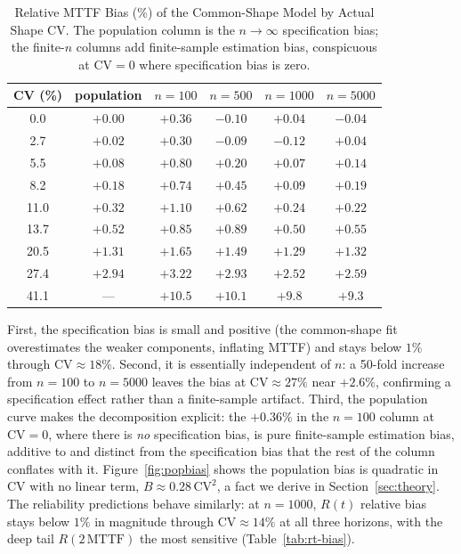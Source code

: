 \documentclass[11pt]{article}
\newcommand{\CV}{\mathrm{CV}}
\newcommand{\MTTF}{\mathrm{MTTF}}
\begin{document}
\begin{table}[htbp]
\centering
\caption{Relative MTTF Bias (\%) of the Common-Shape Model by Actual Shape CV. The population column is the $n\to\infty$ specification bias; the finite-$n$ columns add finite-sample estimation bias, conspicuous at $\CV=0$ where specification bias is zero.}
\label{tab:consequence}
\small
\begin{tabular}{cccccc}
\hline
CV (\%) & population & $n=100$ & $n=500$ & $n=1000$ & $n=5000$ \\
\hline
0.0 & $+0.00$ & $+0.36$ & $-0.10$ & $+0.04$ & $-0.04$ \\
2.7 & $+0.02$ & $+0.30$ & $-0.09$ & $-0.12$ & $+0.04$ \\
5.5 & $+0.08$ & $+0.80$ & $+0.20$ & $+0.07$ & $+0.14$ \\
8.2 & $+0.18$ & $+0.74$ & $+0.45$ & $+0.09$ & $+0.19$ \\
11.0 & $+0.32$ & $+1.10$ & $+0.62$ & $+0.24$ & $+0.22$ \\
13.7 & $+0.52$ & $+0.85$ & $+0.89$ & $+0.50$ & $+0.55$ \\
20.5 & $+1.31$ & $+1.65$ & $+1.49$ & $+1.29$ & $+1.32$ \\
27.4 & $+2.94$ & $+3.22$ & $+2.93$ & $+2.52$ & $+2.59$ \\
41.1 & --- & $+10.5$ & $+10.1$ & $+9.8$ & $+9.3$ \\
\hline
\end{tabular}
\end{table}

First, the specification bias is small and positive (the common-shape fit overestimates the weaker components, inflating MTTF) and stays below $1\%$ through $\CV \approx 18\%$. Second, it is essentially independent of $n$: a 50-fold increase from $n=100$ to $n=5000$ leaves the bias at $\CV\approx 27\%$ near $+2.6\%$, confirming a specification effect rather than a finite-sample artifact. Third, the population curve makes the decomposition explicit: the $+0.36\%$ in the $n=100$ column at $\CV=0$, where there is \emph{no} specification bias, is pure finite-sample estimation bias, additive to and distinct from the specification bias that the rest of the column conflates with it. Figure~\ref{fig:popbias} shows the population bias is quadratic in $\CV$ with no linear term, $B \approx 0.28\,\CV^2$, a fact we derive in Section~\ref{sec:theory}. The reliability predictions behave similarly: at $n=1000$, $R(t)$ relative bias stays below $1\%$ in magnitude through $\CV\approx 14\%$ at all three horizons, with the deep tail $R(2\,\MTTF)$ the most sensitive (Table~\ref{tab:rt-bias}).
\end{document}
